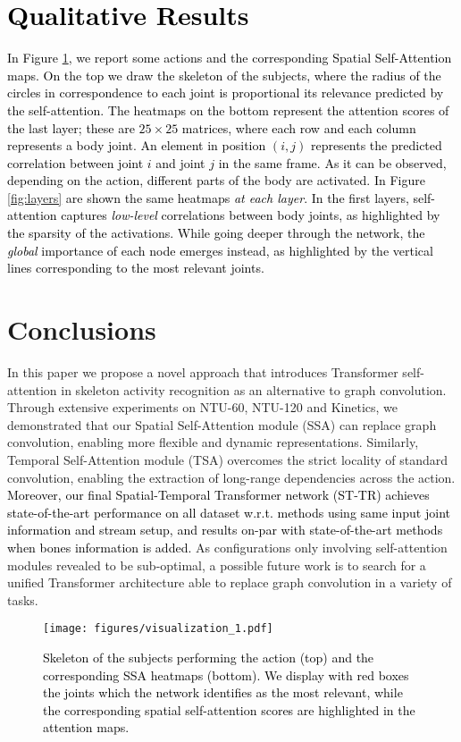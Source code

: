 \documentclass[times,twocolumn,final,authoryear]{elsarticle}
\DeclareRobustCommand{\new}[1]
{{\textcolor{black}{#1}}}
\begin{document}
\section{\new{Qualitative Results}}
\new{In Figure \ref{fig:heatmaps}, we report some actions and the corresponding Spatial Self-Attention maps. On the top we draw the skeleton of the subjects, where the radius of the circles in correspondence to each joint is proportional its relevance predicted by the self-attention. The heatmaps on the bottom represent the attention scores of the last layer; these are $25 \times 25$ matrices, where each row and each column represents a body joint. An element in position $(i,j)$ represents the predicted correlation between joint $i$ and joint $j$ in the same frame. As it can be observed, depending on the action, different parts of the body are activated. In Figure \ref{fig:layers} are shown the same heatmaps \textit{at each layer}. In the first layers, self-attention captures \textit{low-level} correlations between body joints, as highlighted by the sparsity of the activations. While going deeper through the network, the \textit{global} importance of each node emerges instead, as highlighted by the vertical lines corresponding to the most relevant joints. 
}

\section{Conclusions}
In this paper we propose a novel approach that introduces Transformer self-attention in skeleton activity recognition as an alternative to graph convolution. Through extensive experiments on NTU-60, NTU-120 and Kinetics, we demonstrated that our Spatial Self-Attention module (SSA) can replace graph convolution, enabling more flexible and dynamic representations. Similarly, Temporal Self-Attention module (TSA) overcomes the strict locality of standard convolution, enabling the extraction of long-range dependencies across the action. \new{Moreover, our final Spatial-Temporal Transformer network (ST-TR)
achieves state-of-the-art performance on all dataset w.r.t. methods using same input joint information and stream setup, and results on-par with state-of-the-art methods when bones information is added.} As configurations only involving self-attention modules revealed to be sub-optimal, a possible future work is to search for a unified Transformer architecture able to replace graph convolution in a variety of tasks. 
 \begin{figure}[t]
    \centering
    \texttt{[image: figures/visualization\_1.pdf]}
    \caption{\new{Skeleton of the subjects performing the action (top) and the corresponding SSA heatmaps (bottom). We display with red boxes the joints which the network identifies as the most relevant, while the corresponding spatial self-attention scores are highlighted in the attention maps. } 
    }
    \label{fig:heatmaps}
\end{figure}
\end{document}
